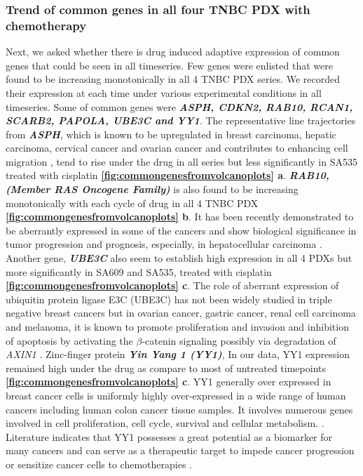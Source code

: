 

\subsubsection{Trend of common genes in all four TNBC PDX with  chemotherapy}
Next, we asked whether there is drug induced adaptive expression of common genes that could be seen in all timeseries. 
 Few genes were enlisted that were found to be increasing monotonically in all 4 TNBC PDX series. We recorded their expression at each time under various experimental conditions in all timeseries. Some of common genes were  \textit{\textbf{ASPH, CDKN2, RAB10, RCAN1, SCARB2, PAPOLA, UBE3C and YY1}}. The representative line trajectories from \textit{\textbf{ASPH}}, which is known to be upregulated in breast carcinoma, hepatic carcinoma, cervical cancer and ovarian cancer and contributes to enhancing cell migration  \cite{zheng2020diverse,li2018expression, hou2018recent, lin2019asph}, tend to rise under the drug in all series but less significantly in SA535 treated with cisplatin \textbf{\autoref{fig:commongenesfromvolcanoplots} a}. 
 \textit{\textbf{RAB10, (Member RAS Oncogene Family)}} is also found to be increasing monotonically with each cycle of drug in all 4 TNBC PDX \textbf{\autoref{fig:commongenesfromvolcanoplots} b}. It has been recently demonstrated to be aberrantly expressed in some of the cancers and show biological significance in tumor progression and prognosis, especially, in hepatocellular carcinoma \cite{wang2017rab10, he2002identification, jiang2016mir}. 
Another gene,  \textit{\textbf{UBE3C}} also seem to establish high expression in all 4 PDXs but more significantly in SA609 and SA535, treated with cisplatin \textbf{\autoref{fig:commongenesfromvolcanoplots} c}. The role of aberrant expression of ubiquitin protein ligase E3C (UBE3C) has not been widely studied in triple negative breast cancers but in ovarian cancer, gastric cancer, renal cell carcinoma and melanoma, it is known to promote proliferation and invasion and inhibition of apoptosis by activating the $\beta$-catenin signaling possibly via degradation of  \textit{AXIN1} \cite{xiong2019mir, pan2015ubiquitin, zhang2020ube3c}.
  Zinc-finger protein  \textit{\textbf{Yin Yang 1 (YY1)}}, In our data, YY1 expression remained high under the drug as compare to most of untreated timepoints \textbf{\autoref{fig:commongenesfromvolcanoplots} c}. YY1 generally over expressed in breast cancer cells 
is uniformly highly over-expressed in a wide range of human cancers including human colon cancer tissue samples. It involves numerous genes involved in cell proliferation, cell cycle, survival and cellular metabolism.  \cite{wan2012yin, chinnappan2009transcription, meliala2020biological}. Literature indicates that YY1 possesses a great potential as a biomarker for many cancers and can serve as a therapeutic target to impede cancer progression or sensitize cancer cells to chemotherapies \cite{wan2012yin, chinnappan2009transcription, meliala2020biological, shi2015role}.

